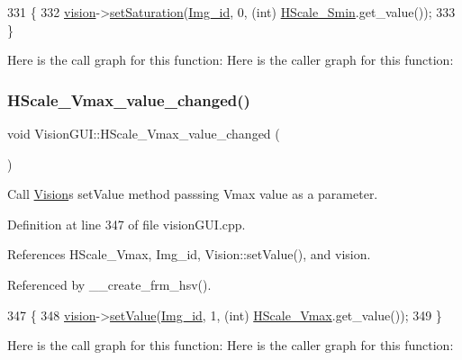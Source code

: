 \begin{DoxyCode}
331                                           \{
332     \hyperlink{class_vision_g_u_i_a36aba058af844ec6cbe0c945c616cd5f}{vision}->\hyperlink{class_vision_a4a07d52d53fa8626e6dd7b36fed89841}{setSaturation}(\hyperlink{class_vision_g_u_i_a4a46f114bc58e0f1d56b655f4bc8f9d8}{Img\_id}, 0, (\textcolor{keywordtype}{int}) \hyperlink{class_vision_g_u_i_a23eb7af1cc6d3a055892de4704b48126}{HScale\_Smin}.get\_value());
333 \}
\end{DoxyCode}
Here is the call graph for this function\+:
Here is the caller graph for this function\+:
\mbox{\label{class_vision_g_u_i_a8446a9425209abafa824d6a8cb539248}} 
\subsubsection{\texorpdfstring{H\+Scale\+\_\+\+Vmax\+\_\+value\+\_\+changed()}{HScale\_Vmax\_value\_changed()}}
{\footnotesize\ttfamily void Vision\+G\+U\+I\+::\+H\+Scale\+\_\+\+Vmax\+\_\+value\+\_\+changed (\begin{DoxyParamCaption}{ }\end{DoxyParamCaption})\hspace{0.3cm}{\ttfamily [private]}}



Call \hyperlink{class_vision}{Vision}\textquotesingle{}s set\+Value method passsing Vmax value as a parameter. 



Definition at line 347 of file vision\+G\+U\+I.\+cpp.



References H\+Scale\+\_\+\+Vmax, Img\+\_\+id, Vision\+::set\+Value(), and vision.



Referenced by \+\_\+\+\_\+create\+\_\+frm\+\_\+hsv().


\begin{DoxyCode}
347                                           \{
348     \hyperlink{class_vision_g_u_i_a36aba058af844ec6cbe0c945c616cd5f}{vision}->\hyperlink{class_vision_a43213a295e6e199c261d141118be14ad}{setValue}(\hyperlink{class_vision_g_u_i_a4a46f114bc58e0f1d56b655f4bc8f9d8}{Img\_id}, 1, (\textcolor{keywordtype}{int}) \hyperlink{class_vision_g_u_i_ab277d08dcce9e2521b9d4c542be69247}{HScale\_Vmax}.get\_value());
349 \}
\end{DoxyCode}
Here is the call graph for this function\+:
Here is the caller graph for this function\+:
\mbox{\label{class_vision_g_u_i_aaba5ce7bcd87c9ce9101f409695b3bd9}} 
